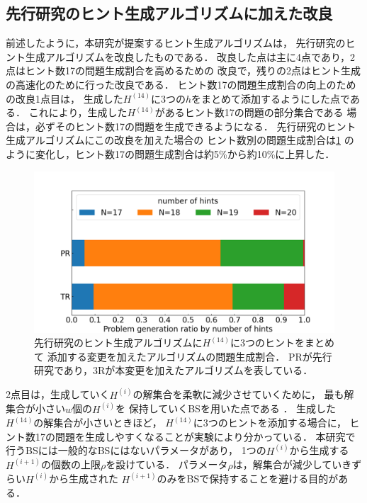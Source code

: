 \documentclass[a4paper, 9pt]{jarticle}
\begin{document}
\begin{論文概要}
\section{先行研究のヒント生成アルゴリズムに加えた改良}
前述したように，本研究が提案するヒント生成アルゴリズムは，
先行研究のヒント生成アルゴリズムを改良したものである．
改良した点は主に4点であり，2点はヒント数17の問題生成割合を高めるための
改良で，残りの2点はヒント生成の高速化のために行った改良である．
ヒント数17の問題生成割合の向上のための改良1点目は，
生成した$H^{(14)}$に3つの$h$をまとめて添加するようにした点である．
これにより，生成した$H^{(14)}$があるヒント数17の問題の部分集合である
場合は，必ずそのヒント数17の問題を生成できるようになる．
先行研究のヒント生成アルゴリズムにこの改良を加えた場合の
ヒント数別の問題生成割合は\figurename{\ref{fig:prob_under_add_3hints}}
のように変化し，ヒント数17の問題生成割合は約5\%から約10\%に上昇した．
\begin{figure}[bt]
  \centering
  \includegraphics[keepaspectratio, scale=0.25]{prob_under_add_3hints.png}
  \caption{先行研究のヒント生成アルゴリズムに$H^{(14)}$に3つのヒントをまとめて
  添加する変更を加えたアルゴリズムの問題生成割合．
  PRが先行研究であり，3Rが本変更を加えたアルゴリズムを表している．} 
  \label{fig:prob_under_add_3hints}
\end{figure}
2点目は，生成していく$H^{(i)}$の解集合を柔軟に減少させていくために，
最も解集合が小さい$w$個の$H^{(i)}$を
保持していくBSを用いた点である \cite{nagao}．
生成した$H^{(14)}$の解集合が小さいときほど，
$H^{(14)}$に3つのヒントを添加する場合に，
ヒント数17の問題を生成しやすくなることが実験により分かっている．
本研究で行うBSには一般的なBSにはないパラメータがあり，
1つの$H^{(i)}$から生成する$H^{(i+1)}$の個数の上限$\rho$を設けている．
パラメータ$\rho$は，解集合が減少していきずらい$H^{(i)}$から生成された
$H^{(i+1)}$のみをBSで保持することを避ける目的がある．
\begin{figure}[bt]

\end{figure}
\end{論文概要}
\end{document}
